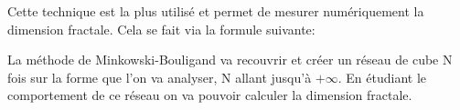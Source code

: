 \documentclass[pdftex,12pt,a4paper]{report}
\begin{document}
Cette technique est la plus utilisé et permet de mesurer numériquement la dimension fractale. Cela se fait via la formule suivante:
\begin{center}
\end{center}

La méthode de Minkowski-Bouligand va recouvrir et créer un réseau de cube N fois sur la forme que l'on va analyser, N allant jusqu'à $+\infty$. En étudiant le comportement de ce réseau on va pouvoir calculer la dimension fractale.
\end{document}
